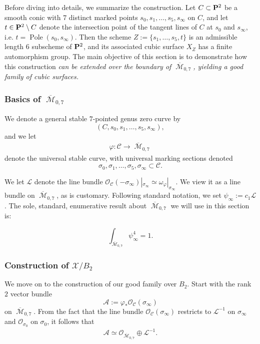 \documentclass[12pt,reqno]{amsart}
\DeclareMathOperator{\Pole}{Pole}
\DeclareMathOperator{\M}{\mathcal{M}}
\renewcommand{\to}{{\longrightarrow}}
\numberwithin{equation}{section}
\renewcommand{\O}{\mathcal O}
\begin{document}
Before diving into details, we summarize the construction. Let
$C \subset \P^{2}$ be a smooth conic with $7$ distinct marked points
$s_{0}, s_{1}, \dots, s_{5}, s_{\infty}$ on $C$, and let
$t \in \P^{2} \setminus C$ denote the intersection point of the
tangent lines of $C$ at $s_{0}$ and $s_{\infty}$, i.e.
$t = \Pole(s_{0},s_{\infty})$.  Then the scheme
$Z := \{s_{1}, \dots , s_{5}, t \}$ is an admissible length $6$
subscheme of $\P^{2}$, and its associated cubic surface $X_{Z}$ has a
finite automorphism group.  The main objective of this section is to
demonstrate how this construction {\sl can be extended over the
  boundary of $\overline{\M}_{0,7}$, yielding a good family of cubic
  surfaces.}

\subsubsection{Basics of $\overline{\M}_{0,7}$}
\label{sec:basics-overlinem_0-7}

We denote a general stable $7$-pointed genus zero curve by
$$(C, s_{0}, s_{1}, \dots, s_{5}, s_{\infty}),$$
and we let 
\begin{align}
  \label{eq:PM07}
  \varphi: \mathcal{C} \to \overline{\M}_{0,7}
\end{align}
denote the universal stable curve, with universal marking sections
denoted $$\sigma_{0}, \sigma_{1}, \dots, \sigma_{5}, \sigma_{\infty} \subset \mathcal{C}.$$

We let $\mathcal{L}$ denote the line bundle
$\O_{\mathcal{C}}(-\sigma_{\infty})|_{\sigma_{\infty}} \simeq
\omega_{\varphi}|_{\sigma_{\infty}}$. We view it as a line bundle on
$\overline{\M}_{0,7}$, as is customary.  Following standard notation,
we set $\psi_{\infty} := c_{1}\mathcal{L}$.  The sole, standard,
enumerative result about $\overline{\M}_{0,7}$ we will use in this
section is:
\begin{theorem}
  \label{theorem:psi}
  $$\int_{\overline{\M}_{0,7}} \psi_{\infty}^{4} = 1.$$
\end{theorem}

\subsubsection{Construction of $\mathcal{X}/B_{2}$}
\label{sec:construction-familyB2}


We move on to the construction of our good family over $B_2$. Start
with the rank $2$ vector bundle
$$\mathcal{A} := \varphi_{*}\O_{\mathcal{C}}(\sigma_{\infty})$$ on
$\overline{\M}_{0,7}$.  From the fact that the line bundle
$\O_{\mathcal{C}}(\sigma_{\infty})$ restricts to $\mathcal{L}^{-1}$ on
$\sigma_{\infty}$ and $\O_{\sigma_{0}}$ on $\sigma_{0}$, it follows
that
\begin{align*}
  \mathcal{A} \simeq \O_{\overline{\M}_{0,7}} \oplus \mathcal{L}^{-1}.
\end{align*}
\end{document}
